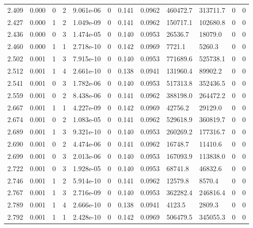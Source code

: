 \documentclass[preview]{standalone}
\begin{document}
{{{{\begin{tabular}{L{1.2cm}C{1.2cm} C{0.3cm}C{0.5cm} C{1.4cm}C{1.4cm} C{1.4cm}C{1.4cm} C{1.6cm}C{1.6cm} C{1.6cm}C{1.6cm}}
  2.409  &  0.000  & 0     &  2 &  9.061e-06  & 0  &  0.141&   0.0962& 460472.7 & 313711.7   &  0 & 0  \\ 
  2.427  &  0.000  & 1     &  2 &  1.049e-09  & 0  &  0.141&   0.0962& 150717.1 & 102680.8   &  0 & 0  \\ 
  2.436  &  0.000  & 0     &  3 &  1.474e-05  & 0  &  0.140&   0.0953& 26536.7 & 18079.0   &  0 & 0  \\ 
  2.460  &  0.000  & 1     &  1 &  2.718e-10  & 0  &  0.142&   0.0969& 7721.1 & 5260.3   &  0 & 0  \\ 
  2.502  &  0.001  & 1     &  3 &  7.915e-10  & 0  &  0.140&   0.0953& 771689.6 & 525738.1   &  0 & 0  \\ 
  2.512  &  0.001  & 1     &  4 &  2.661e-10  & 0  &  0.138&   0.0941& 131960.4 & 89902.2   &  0 & 0  \\ 
  2.541  &  0.001  & 0     &  3 &  1.782e-06  & 0  &  0.140&   0.0953& 517313.8 & 352436.5   &  0 & 0  \\ 
  2.559  &  0.001  & 0     &  2 &  8.438e-06  & 0  &  0.141&   0.0962& 388198.0 & 264472.2   &  0 & 0  \\ 
  2.667  &  0.001  & 1     &  1 &  4.227e-09  & 0  &  0.142&   0.0969& 42756.2 & 29129.0   &  0 & 0  \\ 
  2.674  &  0.001  & 0     &  2 &  1.083e-05  & 0  &  0.141&   0.0962& 529618.9 & 360819.7   &  0 & 0  \\ 
  2.689  &  0.001  & 1     &  3 &  9.321e-10  & 0  &  0.140&   0.0953& 260269.2 & 177316.7   &  0 & 0  \\ 
  2.690  &  0.001  & 0     &  2 &  4.474e-06  & 0  &  0.141&   0.0962& 16748.7 & 11410.6   &  0 & 0  \\ 
  2.699  &  0.001  & 0     &  3 &  2.013e-06  & 0  &  0.140&   0.0953& 167093.9 & 113838.0   &  0 & 0  \\ 
  2.722  &  0.001  & 0     &  3 &  1.928e-05  & 0  &  0.140&   0.0953& 68741.8 & 46832.6   &  0 & 0  \\ 
  2.746  &  0.001  & 1     &  2 &  5.914e-10  & 0  &  0.141&   0.0962& 12579.8 & 8570.4   &  0 & 0  \\ 
  2.767  &  0.001  & 1     &  3 &  2.716e-09  & 0  &  0.140&   0.0953& 362282.4 & 246816.4   &  0 & 0  \\ 
  2.789  &  0.001  & 1     &  4 &  2.666e-10  & 0  &  0.138&   0.0941& 4123.5 & 2809.3   &  0 & 0  \\ 
  2.792  &  0.001  & 1     &  1 &  2.428e-10  & 0  &  0.142&   0.0969& 506479.5 & 345055.3   &  0 & 0  \\ 

\end{tabular}}}}}
\end{document}
